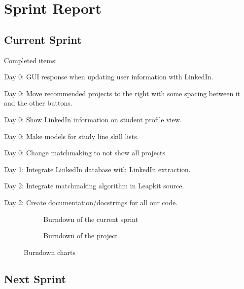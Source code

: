 \section{Sprint Report}

\subsection{Current Sprint}
Completed items:
\begin{itemize*}
    \item Day 0: GUI response when updating user information with LinkedIn.
    \item Day 0: Move recommended projects to the right with some spacing between it and the other buttons.
    \item Day 0: Show LinkedIn information on student profile view.
    \item Day 0: Make models for study line skill lists.
    \item Day 0: Change matchmaking to not show all projects
    \item Day 1: Integrate LinkedIn database with LinkedIn extraction.
    \item Day 2: Integrate matchmaking algorithm in Leapkit source.
    \item Day 2: Create documentation/docstrings for all our code.
\end{itemize*}

\begin{figure}[!ht]
    \centering
    \begin{subfigure}[b]{0.5\textwidth}
        \scalebox{.6}{}
        \caption{Burndown of the current sprint}
        \label{fig:burndownSprint}
    \end{subfigure}%
    \begin{subfigure}[b]{0.5\textwidth}
        \scalebox{.7}{}
        \caption{Burndown of the project}
        \label{fig:burndownProject}
    \end{subfigure}
    \caption{Burndown charts}
    \label{fig:burndown}
\end{figure}

\subsection{Next Sprint}


